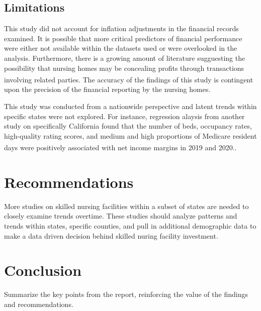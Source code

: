 \documentclass{article}
\theoremstyle{mytheoremstyle}
\theoremstyle{mytheoremstyle}
\theoremstyle{myproblemstyle}
\begin{document}
\subsection{Limitations}

This study did not account for inflation adjustments in the financial records examined. It is possible that more critical predictors of financial performance were either not available within the datasets used or were overlooked in the analysis. Furthermore, there is a growing amount of literature sugguesting the possibility that nursing homes may be concealing profits through transactions involving related parties\textsuperscript{\cite{harrington2024united}}. The accuracy of the findings of this study is contingent upon the precision of the financial reporting by the nursing homes. 

This study was conducted from a nationwide perspective and latent trends within specific states were not explored. For instance, regression alaysis from another study on specifically California  found that the number of beds, occupancy rates, high-quality rating scores, and medium and high proportions of Medicare resident days were positively associated with net income margins in 2019 and 2020.\textsuperscript{\cite{Harrington2023}}. 

\pagebreak
\section{Recommendations}

More studies on skilled nursing facilities within a subset of states are needed to closely examine trends overtime. These studies should analyze patterns and trends within states, specific counties, and pull in additional demographic data to make a data driven decision behind skilled nuring facility investment. 


\pagebreak
\section{Conclusion}
Summarize the key points from the report, reinforcing the value of the findings and recommendations.
\end{document}
